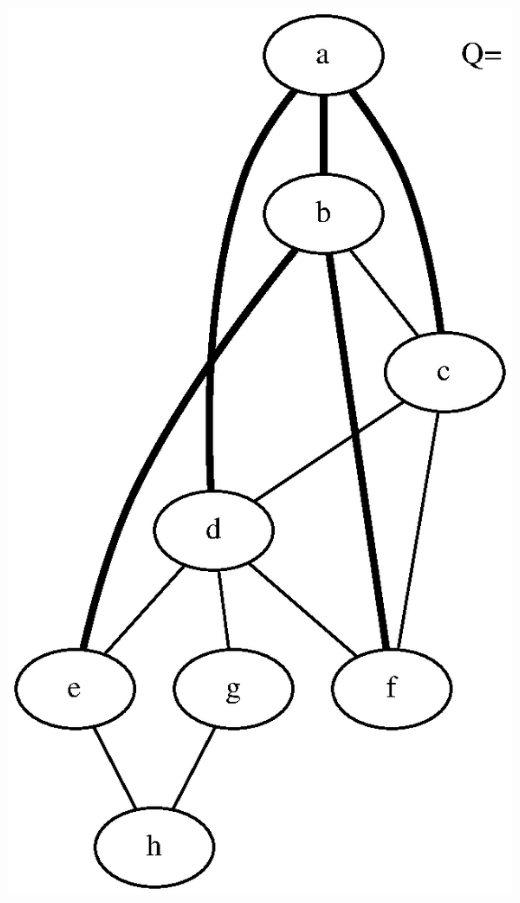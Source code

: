 \documentclass{article}
\begin{document}
\includegraphics[height=.3\textheight]{bfs_undirected_classroom_02.eps}
\vspace{1em}
\end{document}
